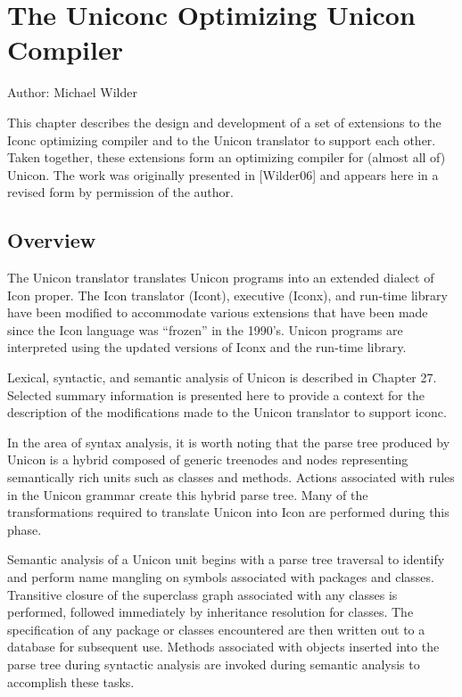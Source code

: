 \chapter{The Uniconc Optimizing Unicon Compiler}

Author: Michael Wilder

\bigskip

\def\Ut/{Unicon$^\Delta$}
\def\UT/{UNICON$^\Delta$}
\def\Ic/{Iconc$^\Delta$}
\def\IC/{ICONC$^\Delta$}
\def\Rtl/{RTL$^\Delta$}
\def\sctn#1{\smallskip\begin{center} {\bf #1}\\ \end{center}\par}

This chapter describes the design and development of a set of
extensions to the Iconc optimizing compiler and to the Unicon
translator to support each other. Taken together, these extensions
form an optimizing compiler for (almost all of) Unicon.  The work was
originally presented in [Wilder06] and appears here in a revised form
by permission of the author.

\section{Overview}

The Unicon translator translates Unicon programs into an extended
dialect of Icon proper. The Icon translator (Icont), executive
(Iconx), and \mbox{run-time} library have been modified to accommodate
various extensions that have been made since the Icon language was
``frozen'' in the 1990's. Unicon programs are interpreted using the
updated versions of Iconx and the \mbox{run-time} library.

Lexical, syntactic, and semantic analysis of Unicon is described in
Chapter 27. Selected summary information is presented here to provide
a context for the description of the modifications made to the Unicon
translator to support iconc.

In the area of syntax analysis, it is worth noting that the parse tree
produced by Unicon is a hybrid composed of generic treenodes and nodes
representing semantically rich units such as classes and
methods. Actions associated with rules in the Unicon grammar create
this hybrid parse tree. Many of the transformations required to
translate Unicon into Icon are performed during this phase.

Semantic analysis of a Unicon unit begins with a parse tree traversal
to identify and perform name mangling on symbols associated with
packages and classes. Transitive closure of the superclass graph
associated with any classes is performed, followed immediately by
inheritance resolution for classes. The specification of any package
or classes encountered are then written out to a database for
subsequent use.  Methods associated with objects inserted into the
parse tree during syntactic analysis are invoked during semantic
analysis to accomplish these tasks.

